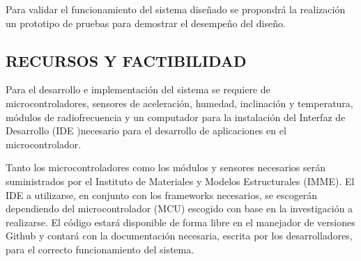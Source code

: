 \documentclass[12pt,letterpaper]{article}
\newcommand{\newfig}[4]{%
\begin{figure}[H]%
\centering%
\texttt{[image: \#2]}%
\caption{\emph{\small{#3}}}%
\label{fig:#4}
\end{figure}%
}
\begin{document}
Para validar el funcionamiento del sistema diseñado se propondrá la realización un prototipo de pruebas para demostrar el desempeño del diseño.





\newpage

\begin{center}
	\section*{ RECURSOS Y FACTIBILIDAD}
\end{center}

Para el desarrollo e implementación del sistema se requiere de microcontroladores, sensores de aceleración, humedad, inclinación y temperatura, módulos de radiofrecuencia y un computador para la instalación del Interfaz de Desarrollo (IDE )necesario para el desarrollo de aplicaciones en el microcontrolador.

Tanto los microcontroladores como los módulos y sensores necesarios serán suministrados por el Instituto de Materiales y Modelos Estructurales (IMME). El IDE a utilizarse, en conjunto con los frameworks necesarios, se escogerán dependiendo del microcontrolador (MCU) escogido con base en la investigación a realizarse. El código estará disponible de forma libre en el manejador de versiones Github y contará con la documentación necesaria, escrita por los desarrolladores, para el correcto funcionamiento del sistema.

\newpage
\end{document}
